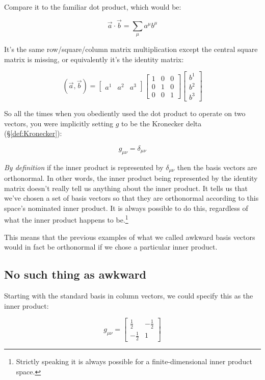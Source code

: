 Compare it to the familiar dot product, which would be:

$$
\vec{a} \cdot \vec{b} = \sum_{\mu} a^\mu b^\mu
$$

It's the same row/square/column matrix multiplication except the central square matrix is missing, or equivalently it's the identity matrix:

$$
(\vec{a}, \vec{b}) =
\begin{bmatrix}
a^1 & a^2 & a^3
\end{bmatrix}
\begin{bmatrix}
1 & 0 & 0 \\
0 & 1 & 0 \\
0 & 0 & 1
\end{bmatrix}
\begin{bmatrix}
b^1 \\ b^2 \\ b^3
\end{bmatrix}
$$

So all the times when you obediently used the dot product to operate on two vectors, you were implicitly setting $g$ to be the Kronecker delta (§\ref{def:Kronecker}):

$$
g_{\mu\nu} = \delta_{\mu\nu}
$$

\textit{By definition} if the inner product is represented by $\delta_{\mu\nu}$ then the basis vectors are orthonormal. In other words, the inner product being represented by the identity matrix doesn't really tell us anything about the inner product. It tells us that we've chosen a set of basis vectors so that they are orthonormal according to this space's nominated inner product. It is always possible to do this, regardless of what the inner product happens to be.\footnote{Strictly speaking it is always possible for a finite-dimensional inner product space.}

This means that the previous examples of what we called awkward basis vectors would in fact be orthonormal if we chose a particular inner product.

\subsection{No such thing as awkward}

Starting with the standard basis in column vectors, we could specify this as the inner product:

$$
g_{\mu\nu} = 
\begin{bmatrix}
\frac{1}{2} & -\frac{1}{2} \\
-\frac{1}{2} & 1
\end{bmatrix}
$$

